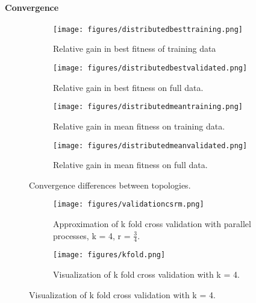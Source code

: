 \paragraph{Convergence}
\begin{figure*}
    \centering
    \begin{subfigure}{0.5\textwidth}
    \centering
        \texttt{[image: figures/distributedbesttraining.png]}
        \caption{Relative gain in best fitness of training data}
    \end{subfigure}%
    \begin{subfigure}{0.5\textwidth}
    \centering
        \texttt{[image: figures/distributedbestvalidated.png]}
        \caption{Relative gain in best fitness on full data.}
    \end{subfigure}
        \begin{subfigure}{0.5\textwidth}
    \centering
        \texttt{[image: figures/distributedmeantraining.png]}
        \caption{Relative gain in mean fitness on training data.}
    \end{subfigure}%
    \begin{subfigure}{0.5\textwidth}
    \centering
        \texttt{[image: figures/distributedmeanvalidated.png]}
        \caption{Relative gain in mean fitness on full data.}
    \end{subfigure}
    \caption{Convergence differences between topologies.}
    \label{fig:distributedresults}
\end{figure*}
\begin{figure}
	\begin{subfigure}{0.5\textwidth}\label{fig:csrmkfold}
    \texttt{[image: figures/validationcsrm.png]}
    \caption{Approximation of k fold cross validation with parallel processes, k = 4,  r = $\frac{3}{4}$.}
    \end{subfigure}
	\begin{subfigure}{0.5\textwidth}    \label{fig:kfold}

    \centering
    \texttt{[image: figures/kfold.png]}
    \caption{Visualization of k fold cross validation with k = 4.}
    \end{subfigure}%
    \label{fig:ckfold}
 \end{figure}
